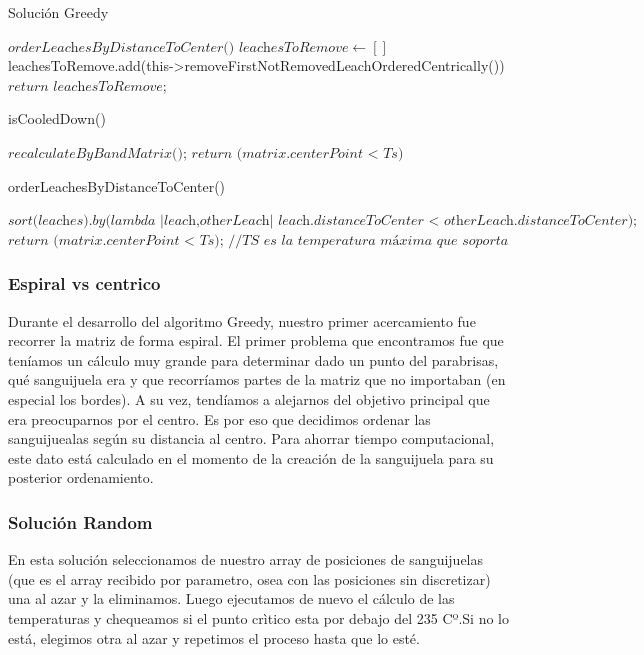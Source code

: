 \begin{algorithm}
\caption{Solución Greedy}\label{euclid}
\begin{algorithmic}[1]
\State $\textit{orderLeachesByDistanceToCenter()}$
\State $\textit{leachesToRemove} \gets []$
\Do
    \State leachesToRemove.add(this->removeFirstNotRemovedLeachOrderedCentrically())
\State $\textit{return leachesToRemove;}$
\end{algorithmic}
\end{algorithm}

\begin{algorithm}
\caption{isCooledDown()}\label{euclid}
\begin{algorithmic}[1]
\State $\textit{recalculateByBandMatrix();}$
\State $\textit{return (matrix.centerPoint < Ts)}$ 
\end{algorithmic}
\end{algorithm}

\begin{algorithm}
\caption{orderLeachesByDistanceToCenter()}\label{euclid}
\begin{algorithmic}[1]
\State $\textit{sort(leaches).by(lambda {|leach,otherLeach| leach.distanceToCenter < otherLeach.distanceToCenter});}$
\State $\textit{return (matrix.centerPoint < Ts); //TS es la temperatura máxima que soporta el centro}$
\end{algorithmic}
\end{algorithm}


\subsubsection{Espiral vs centrico}
	Durante el desarrollo del algoritmo Greedy, nuestro primer acercamiento fue recorrer la matriz de forma espiral. El primer problema que encontramos fue que teníamos un cálculo muy grande para determinar dado un punto del parabrisas, qué sanguijuela era y que recorríamos partes de la matriz que no importaban (en especial los bordes). A su vez, tendíamos a alejarnos del objetivo principal que era preocuparnos por el centro. Es por eso que decidimos ordenar las sanguijuealas según su distancia al centro. Para ahorrar tiempo computacional, este dato está calculado en el momento de la creación de la sanguijuela para su posterior ordenamiento.

\subsubsection{Solución Random}\label{sec:solucionRandom}
En esta solución seleccionamos de nuestro array de posiciones de sanguijuelas (que es el array recibido por parametro, osea con las posiciones sin discretizar) una al azar y la eliminamos. Luego ejecutamos de nuevo el cálculo de las temperaturas y chequeamos si el punto crìtico esta por debajo del 235 Cº.Si no lo está, elegimos otra al azar y repetimos el proceso hasta que lo esté. 

